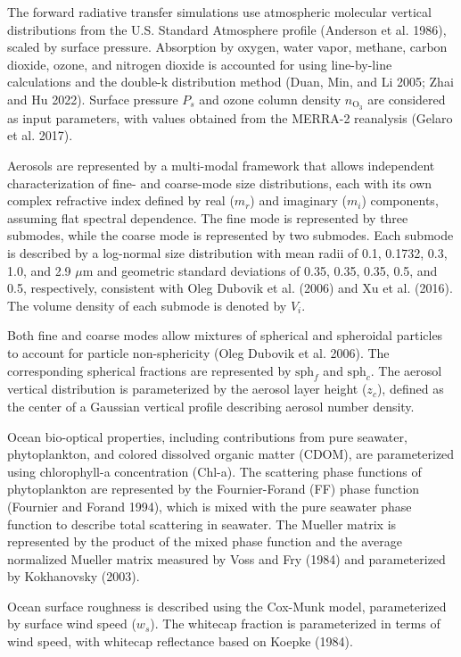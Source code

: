 \documentclass[
  letterpaper,
  open=any]{scrbook}
\begin{document}
The forward radiative transfer simulations use atmospheric molecular
vertical distributions from the U.S. Standard Atmosphere profile
(Anderson et al. 1986), scaled by surface pressure. Absorption by
oxygen, water vapor, methane, carbon dioxide, ozone, and nitrogen
dioxide is accounted for using line-by-line calculations and the
double-k distribution method (Duan, Min, and Li 2005; Zhai and Hu 2022).
Surface pressure \(P_s\) and ozone column density \(n_{\mathrm{O}_3}\)
are considered as input parameters, with values obtained from the
MERRA-2 reanalysis (Gelaro et al. 2017).

Aerosols are represented by a multi-modal framework that allows
independent characterization of fine- and coarse-mode size
distributions, each with its own complex refractive index defined by
real (\(m_r\)) and imaginary (\(m_i\)) components, assuming flat
spectral dependence. The fine mode is represented by three submodes,
while the coarse mode is represented by two submodes. Each submode is
described by a log-normal size distribution with mean radii of 0.1,
0.1732, 0.3, 1.0, and 2.9 \(\mu\mathrm{m}\) and geometric standard
deviations of 0.35, 0.35, 0.35, 0.5, and 0.5, respectively, consistent
with Oleg Dubovik et al. (2006) and Xu et al. (2016). The volume density
of each submode is denoted by \(V_i\).

Both fine and coarse modes allow mixtures of spherical and spheroidal
particles to account for particle non-sphericity (Oleg Dubovik et al.
2006). The corresponding spherical fractions are represented by
\(\mathrm{sph}_f\) and \(\mathrm{sph}_c\). The aerosol vertical
distribution is parameterized by the aerosol layer height (\(z_c\)),
defined as the center of a Gaussian vertical profile describing aerosol
number density.

Ocean bio-optical properties, including contributions from pure
seawater, phytoplankton, and colored dissolved organic matter (CDOM),
are parameterized using chlorophyll-a concentration (Chl-a). The
scattering phase functions of phytoplankton are represented by the
Fournier-Forand (FF) phase function (Fournier and Forand 1994), which is
mixed with the pure seawater phase function to describe total scattering
in seawater. The Mueller matrix is represented by the product of the
mixed phase function and the average normalized Mueller matrix measured
by Voss and Fry (1984) and parameterized by Kokhanovsky (2003).

Ocean surface roughness is described using the Cox-Munk model,
parameterized by surface wind speed (\(w_s\)). The whitecap fraction is
parameterized in terms of wind speed, with whitecap reflectance based on
Koepke (1984).
\end{document}
